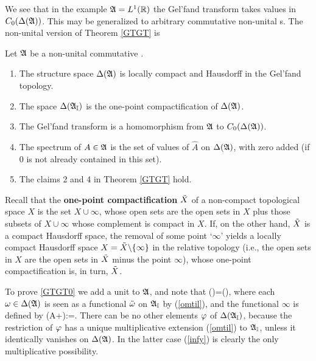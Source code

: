 We see that in the example ${\frak A}=L^1({\Bbb R})$ the Gel'fand transform takes
values in $C_0(\Delta({\frak A}))$. This may be generalized to arbitrary commutative
non-unital \BA s. The non-unital version of Theorem \ref{GTGT} is
\begin{Theorem} Let ${\frak A}$ be a non-unital commutative \BA.
\begin{enumerate}
\item
The structure space $\Delta({\frak A})$ is locally compact and Hausdorff in the
Gel'fand topology.
\item
The space $\Delta({\frak A}_{\Bbb I})$ is the one-point compactification of $\Delta({\frak A})$.
\item
The Gel'fand transform is a homomorphism from ${\frak A}$ to $C_0(\Delta({\frak A}))$.
\item
The spectrum of $A\in{\frak A}$ is the set of values of $\hat{A}$ on $\Delta({\frak A})$,
with zero added (if 0 is not already contained in this set).
\item
The claims 2 and 4 in Theorem \ref{GTGT} hold.
\end{enumerate} \end{Theorem}

Recall that the {\bf one-point compactification} $\tilde{X}$ of a
non-compact topological space $X$ is the set $X\cup\infty$, whose open
sets are the open sets in $X$ plus those subsets of $X\cup\infty$
whose complement is compact in $X$.  If, on the other hand, $\tilde{X}$
is a compact Hausdorff space, the removal of some point `$\infty$'
yields a locally compact Hausdorff space
$X=\tilde{X}\backslash\{\infty\}$ in the relative topology (i.e., the
open sets in $X$ are the open sets in $\tilde{X}$ minus the point
$\infty$), whose one-point compactification is, in turn, $\tilde{X}$.

To prove \ref{GTGT0} we add a unit to ${\frak A}$, and note that \be
\Dl(\AI)=\Dl(\A)\cup\infty, \ee where each $\omega\in\Delta({\frak A})$ is
seen as a functional $\tilde{\omega}$ on ${\frak A}_{\Bbb I}$ by (\ref{omtil}), and the
functional $\infty$ is defined by \be \infty(A+\lm\I):=\lm . 
\ee There can be no other elements $\varphi$ of $\Delta({\frak A}_{\Bbb I})$, because the
restriction of $\varphi$ has a unique multiplicative extension
(\ref{omtil}) to ${\frak A}_{\Bbb I}$, unless it identically vanishes on $\Delta({\frak A})$. In
the latter case (\ref{infy}) is clearly the only multiplicative
possibility.

